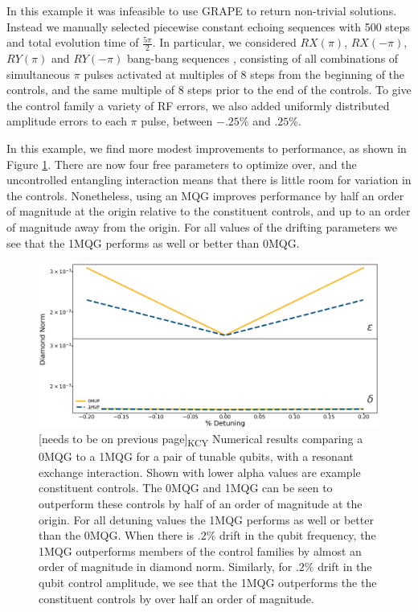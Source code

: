 \documentclass[aps,nofootinbib,pra,notitlepage,twocolumn]{revtex4-1}
\newcommand{\kcy}[1]{{\color{red}[#1]\textsubscript{\rm{KCY}}}}
\begin{document}
In this example it was infeasible to use GRAPE to return non-trivial solutions. Instead we manually selected piecewise constant echoing sequences with 500 steps and total evolution time of $\frac{5\pi}{2}$. In particular, we considered $RX(\pi)$, $RX(-\pi)$, $RY(\pi)$ and $RY(-\pi)$ bang-bang sequences \cite{bangbang}, consisting of all combinations of simultaneous $\pi$ pulses activated at multiples of $8$ steps from the beginning of the controls, and the same multiple of $8$ steps prior to the end of the controls. To give the control family a variety of RF errors, we also added uniformly distributed amplitude errors to each $\pi$ pulse, between $-.25$\% and $.25$\%.

In this example, we find more modest improvements to performance, as shown in Figure \ref{fig:2MQG}. There are now four free parameters to optimize over, and the uncontrolled entangling interaction means that there is little room for variation in the controls. Nonetheless, using an MQG improves performance by half an order of magnitude at the origin relative to the constituent controls, and up to an order of magnitude away from the origin. For all values of the drifting parameters we see that the 1MQG performs as well or better than 0MQG.

\begin{figure}
  \centering
  \includegraphics[width=\columnwidth]{2QRBC_no_member.png}
  \caption{\kcy{needs to be on previous page} Numerical results comparing a 0MQG to a 1MQG for a pair of tunable qubits, with a resonant exchange interaction. Shown with lower alpha values are example constituent controls. The 0MQG and 1MQG can be seen to outperform these controls by half of an order of magnitude at the origin. For all detuning values the 1MQG performs as well or better than the 0MQG. When there is $.2\%$ drift in the qubit frequency, the 1MQG outperforms members of the control families by almost an order of magnitude in diamond norm. Similarly, for $.2\%$ drift in the qubit control amplitude, we see that the 1MQG outperforms the the constituent controls by over half an order of magnitude.}
  \label{fig:2MQG}
\end{figure}
\end{document}
